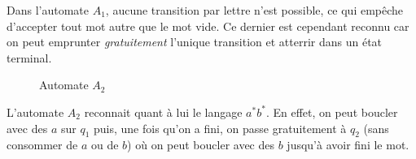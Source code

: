 \documentclass{article}[11pt]
\theoremstyle{definition}
\begin{document}
Dans l'automate $A_1$, aucune transition par lettre n'est possible, ce qui empêche d'accepter tout mot autre que le mot vide. Ce dernier est cependant reconnu car on peut emprunter \textit{gratuitement} l'unique transition et atterrir dans un état terminal.


\begin{figure}[!h]
\centering

\caption{Automate $A_2$}
\end{figure}
\newpage
L'automate $A_2$ reconnait quant à lui le langage $a^*b^*$. En effet, on peut boucler avec des $a$ sur $q_1$ puis, une fois qu'on a fini, on passe gratuitement à $q_2$ (sans consommer de $a$ ou de $b$) où on peut boucler avec des $b$ jusqu'à avoir fini le mot.
\end{document}

